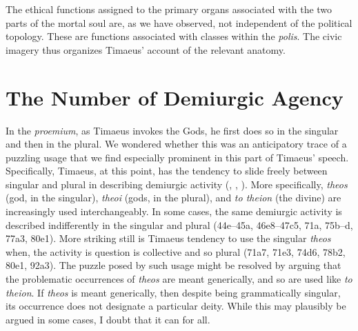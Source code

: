 The ethical functions assigned to the primary organs associated with the two parts of the mortal soul are, as we have observed, not independent of the political topology. These are functions associated with classes within the \emph{polis}. The civic imagery thus organizes Timaeus' account of the relevant anatomy. 


\section{The Number of Demiurgic Agency} %
\label{sec:the_number_of_demiurgic_agency}

In the \emph{proemium}, as Timaeus invokes the Gods, he first does so in the singular and then in the plural. We wondered whether this was an anticipatory trace of a puzzling usage that we find especially prominent in this part of Timaeus' speech. Specifically, Timaeus, at this point, has the tendency to slide freely between singular and plural in describing demiurgic activity (\citealt[280]{Cornford:1935fk}, \citealt[169]{Grube:1935ad}, \citealt[608]{Cherniss:1944aa}). More specifically, \emph{theos} (god, in the singular), \emph{theoi} (gods, in the plural), and \emph{to theion} (the divine) are increasingly used interchangeably. In some cases, the same demiurgic activity is described indifferently in the singular and plural (44e--45a, 46e8--47c5, 71a, 75b--d, 77a3, 80e1). More striking still is Timaeus tendency to use the singular \emph{theos} when, the activity is question is collective and so plural (71a7, 71e3, 74d6, 78b2, 80e1, 92a3). The puzzle posed by such usage might be resolved by arguing that the problematic occurrences of \emph{theos} are meant generically, and so are used like \emph{to theion}. If \emph{theos} is meant generically, then despite being grammatically singular, its occurrence does not designate a particular deity. While this may plausibly be argued in some cases, I doubt that it can for all. 

